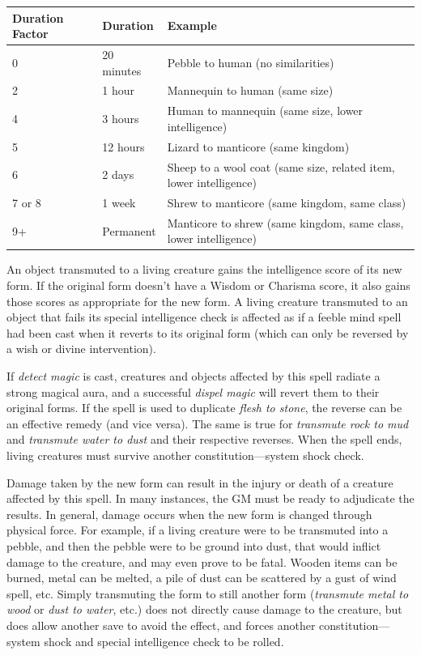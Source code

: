 \begin{multicols}{2}
\noindent
\begin{tabular}{|p{}|p{}|p{}|}
\hline
Duration Factor	 & Duration	 & Example \\
\hline\hline
\rowcolor[gray]{.9}0	& 20 minutes	& Pebble to human (no similarities) \\
2	& 1 hour	& Mannequin to human (same size) \\
\rowcolor[gray]{.9}4	& 3 hours	& Human to mannequin (same size, lower intelligence) \\
5	& 12 hours	& Lizard to manticore (same kingdom) \\
\rowcolor[gray]{.9}6	& 2 days	& Sheep to a wool coat (same size, related item, lower intelligence) \\
7 or 8	& 1 week	& Shrew to manticore (same kingdom, same class) \\
\rowcolor[gray]{.9}9+	& Permanent	& Manticore to shrew (same kingdom, same class, lower intelligence) \\
\hline
\end{tabular}

An object transmuted to a living creature gains the intelligence score of its new form.  If the original form doesn't have a Wisdom or Charisma score, it also gains those scores as appropriate for the new form.  A living creature transmuted to an object that fails its special intelligence check is affected as if a feeble mind spell had been cast when it reverts to its original form (which can only be reversed by a wish or divine intervention).

If \textit{detect magic} is cast, creatures and objects affected by this spell radiate a strong magical aura, and a successful \textit{dispel magic} will revert them to their original forms.  If the spell is used to duplicate \textit{flesh to stone}, the reverse can be an effective remedy (and vice versa).  The same is true for \textit{transmute rock to mud} and \textit{transmute water to dust} and their respective reverses.  When the spell ends, living creatures must survive another constitution---system shock check.  

Damage taken by the new form can result in the injury or death of a creature affected by this spell.  In many instances, the GM must be ready to adjudicate the results.  In general, damage occurs when the new form is changed through physical force.  For example, if a living creature were to be transmuted into a pebble, and then the pebble were to be ground into dust, that would inflict damage to the creature, and may even prove to be fatal.  Wooden items can be burned, metal can be melted, a pile of dust can be scattered by a gust of wind spell, etc.  Simply transmuting the form to still another form (\textit{transmute metal to wood} or \textit{dust to water}, etc.) does not directly cause damage to the creature, but does allow another save to avoid the effect, and forces another constitution---system shock and special intelligence check to be rolled.


\end{multicols}

